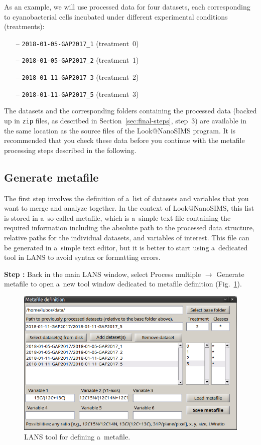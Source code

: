 \documentclass[a4paper, 11pt]{article}
\newcommand{\ttt}[1]{\texttt{#1}}
\newcommand{\lans}[1]{{\color{magenta}#1}}
\newcommand\ra{\rightarrow}
\newcounter{step}
\newcommand\s{\addtocounter{step}{1}\vskip5pt\noindent\textbf{Step \thestep:}{ }}
\begin{document}
As an example, we will use processed data for four datasets, each corresponding to cyanobacterial cells incubated under different experimental conditions (treatments): 
\begin{itemize}
\item[--]\ttt{2018-01-05-GAP2017\_1} (treatment~0)
\item[--]\ttt{2018-01-05-GAP2017\_2} (treatment~1)
\item[--]\ttt{2018-01-11-GAP2017\ 3} (treatment~2)
\item[--]\ttt{2018-01-11-GAP2017\_5} (treatment~3)
\end{itemize}
The datasets and the corresponding folders containing the processed data (backed up in \ttt{zip} files, as described in Section~\ref{sec:final-steps}, step~3) are available in the same location as the source files of the Look@NanoSIMS program. It is recommended that you check these data before you continue with the metafile processing steps described in the following.


\subsection{Generate metafile}
\setcounter{step}{0}

The first step involves the definition of a~list of datasets and variables that you want to merge and analyze together. In the context of Look@NanoSIMS, this list is stored in a~so-called metafile, which is a~simple text file containing the required information including the absolute path to the processed data structure, relative paths for the individual datasets, and variables of interest. This file can be generated in a~simple text editor, but it is better to start using a~dedicated tool in LANS to avoid syntax or formatting errors.

\s Back in the main LANS window, select \lans{Process multiple} $\ra$ \lans{Generate metafile} to open a~new tool window dedicated to metafile definition (Fig.~\ref{fig:metafile-definition}). 

\begin{figure}[!ht]
\centering
\includegraphics[scale=0.4]{figs3/LANS-metafile-definition}
\caption{\label{fig:metafile-definition}%
LANS tool for defining a~metafile.}
\end{figure}
\end{document}
